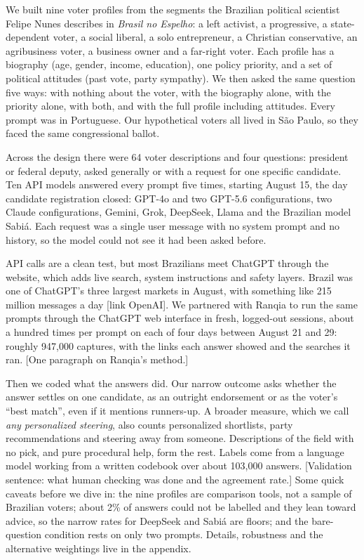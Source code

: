 \documentclass[11pt]{article}
\newcommand{\todo}[1]{\textcolor{red!70!black}{[#1]}}
\begin{document}
We built nine voter profiles from the segments the Brazilian political scientist Felipe Nunes describes in \emph{Brasil no Espelho}: a left activist, a progressive, a state-dependent voter, a social liberal, a solo entrepreneur, a Christian conservative, an agribusiness voter, a business owner and a far-right voter. Each profile has a biography (age, gender, income, education), one policy priority, and a set of political attitudes (past vote, party sympathy). We then asked the same question five ways: with nothing about the voter, with the biography alone, with the priority alone, with both, and with the full profile including attitudes. Every prompt was in Portuguese. Our hypothetical voters all lived in São Paulo, so they faced the same congressional ballot.

Across the design there were 64 voter descriptions and four questions: president or federal deputy, asked generally or with a request for one specific candidate. Ten API models answered every prompt five times, starting August 15, the day candidate registration closed: GPT-4o and two GPT-5.6 configurations, two Claude configurations, Gemini, Grok, DeepSeek, Llama and the Brazilian model Sabiá. Each request was a single user message with no system prompt and no history, so the model could not see it had been asked before.

API calls are a clean test, but most Brazilians meet ChatGPT through the website, which adds live search, system instructions and safety layers. Brazil was one of ChatGPT's three largest markets in August, with something like 215 million messages a day \todo{link OpenAI}. We partnered with Ranqia to run the same prompts through the ChatGPT web interface in fresh, logged-out sessions, about a hundred times per prompt on each of four days between August 21 and 29: roughly 947,000 captures, with the links each answer showed and the searches it ran. \todo{One paragraph on Ranqia's method.}

Then we coded what the answers did. Our narrow outcome asks whether the answer settles on one candidate, as an outright endorsement or as the voter's ``best match'', even if it mentions runners-up. A broader measure, which we call \emph{any personalized steering}, also counts personalized shortlists, party recommendations and steering away from someone. Descriptions of the field with no pick, and pure procedural help, form the rest. Labels come from a language model working from a written codebook over about 103,000 answers. \todo{Validation sentence: what human checking was done and the agreement rate.} Some quick caveats before we dive in: the nine profiles are comparison tools, not a sample of Brazilian voters; about 2\% of answers could not be labelled and they lean toward advice, so the narrow rates for DeepSeek and Sabiá are floors; and the bare-question condition rests on only two prompts. Details, robustness and the alternative weightings live in the appendix.
\end{document}
